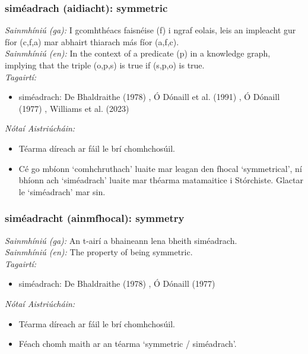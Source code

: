 \documentclass{article}
\begin{document}
\subsubsection*{siméadrach (aidiacht): symmetric}
 \noindent \textit{Sainmhíniú (ga):} I gcomhthéacs faisnéise (f) i ngraf eolais, leis an impleacht gur fíor (c,f,a) mar abhairt thiarach más fíor (a,f,c).
\\
 \noindent \textit{Sainmhíniú (en):} In the context of a predicate (p) in a knowledge graph, implying that the triple (o,p,s) is true if (s,p,o) is true.
\\
 \noindent \textit{Tagairtí:}
\begin{itemize}
	\item siméadrach: De Bhaldraithe (1978) \cite{de-bhaldraithe}, Ó Dónaill et al. (1991) \cite{focloir-beag}, Ó Dónaill (1977) \cite{odonaill}, Williams et al. (2023) \cite{storchiste}
\end{itemize}

 \noindent \textit{Nótaí Aistriúcháin:}
\begin{itemize}
	\item Téarma díreach ar fáil le brí chomhchosúil.
	\item Cé go mbíonn `comhchruthach' luaite mar leagan den fhocal `symmetrical', ní bhíonn ach `siméadrach' luaite mar théarma matamaitice i Stórchiste. Glactar le `siméadrach' mar sin.
\end{itemize}


\subsubsection*{siméadracht (ainmfhocal): symmetry}
 \noindent \textit{Sainmhíniú (ga):} An t-airí a bhaineann lena bheith siméadrach.
\\
 \noindent \textit{Sainmhíniú (en):} The property of being symmetric.
\\
 \noindent \textit{Tagairtí:}
\begin{itemize}
	\item siméadrach: De Bhaldraithe (1978) \cite{de-bhaldraithe}, Ó Dónaill (1977) \cite{odonaill}
\end{itemize}

 \noindent \textit{Nótaí Aistriúcháin:}
\begin{itemize}
	\item Téarma díreach ar fáil le brí chomhchosúil.
	\item Féach chomh maith ar an téarma `symmetric / siméadrach'.
\end{itemize}
\end{document}
